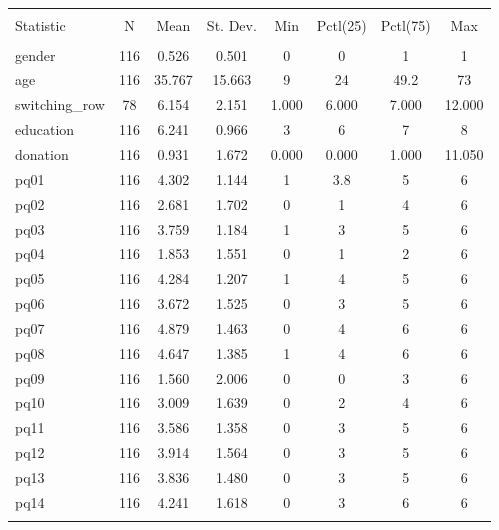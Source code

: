 \documentclass[11pt,]{article}
\begin{document}
\begin{table}[!htbp] \centering 
  \caption{} 
  \label{} 
\begin{tabular}{@{\extracolsep{5pt}}lccccccc} 
\\[-1.8ex]\hline 
\hline \\[-1.8ex] 
Statistic & \multicolumn{1}{c}{N} & \multicolumn{1}{c}{Mean} & \multicolumn{1}{c}{St. Dev.} & \multicolumn{1}{c}{Min} & \multicolumn{1}{c}{Pctl(25)} & \multicolumn{1}{c}{Pctl(75)} & \multicolumn{1}{c}{Max} \\ 
\hline \\[-1.8ex] 
gender & 116 & 0.526 & 0.501 & 0 & 0 & 1 & 1 \\ 
age & 116 & 35.767 & 15.663 & 9 & 24 & 49.2 & 73 \\ 
switching\_row & 78 & 6.154 & 2.151 & 1.000 & 6.000 & 7.000 & 12.000 \\ 
education & 116 & 6.241 & 0.966 & 3 & 6 & 7 & 8 \\ 
donation & 116 & 0.931 & 1.672 & 0.000 & 0.000 & 1.000 & 11.050 \\ 
pq01 & 116 & 4.302 & 1.144 & 1 & 3.8 & 5 & 6 \\ 
pq02 & 116 & 2.681 & 1.702 & 0 & 1 & 4 & 6 \\ 
pq03 & 116 & 3.759 & 1.184 & 1 & 3 & 5 & 6 \\ 
pq04 & 116 & 1.853 & 1.551 & 0 & 1 & 2 & 6 \\ 
pq05 & 116 & 4.284 & 1.207 & 1 & 4 & 5 & 6 \\ 
pq06 & 116 & 3.672 & 1.525 & 0 & 3 & 5 & 6 \\ 
pq07 & 116 & 4.879 & 1.463 & 0 & 4 & 6 & 6 \\ 
pq08 & 116 & 4.647 & 1.385 & 1 & 4 & 6 & 6 \\ 
pq09 & 116 & 1.560 & 2.006 & 0 & 0 & 3 & 6 \\ 
pq10 & 116 & 3.009 & 1.639 & 0 & 2 & 4 & 6 \\ 
pq11 & 116 & 3.586 & 1.358 & 0 & 3 & 5 & 6 \\ 
pq12 & 116 & 3.914 & 1.564 & 0 & 3 & 5 & 6 \\ 
pq13 & 116 & 3.836 & 1.480 & 0 & 3 & 5 & 6 \\ 
pq14 & 116 & 4.241 & 1.618 & 0 & 3 & 6 & 6 \\ 
\hline \\[-1.8ex] 
\end{tabular} 
\end{table}
\end{document}

